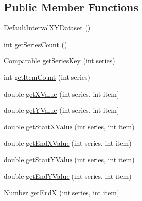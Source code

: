 \subsection*{Public Member Functions}
\begin{DoxyCompactItemize}
\item 
\mbox{\hyperlink{classorg_1_1jfree_1_1data_1_1xy_1_1_default_interval_x_y_dataset_a9995dbf4970a0f92bd1b1819335b4300}{Default\+Interval\+X\+Y\+Dataset}} ()
\item 
int \mbox{\hyperlink{classorg_1_1jfree_1_1data_1_1xy_1_1_default_interval_x_y_dataset_a11470bfa9b540c971123d4282c0f5a8a}{get\+Series\+Count}} ()
\item 
Comparable \mbox{\hyperlink{classorg_1_1jfree_1_1data_1_1xy_1_1_default_interval_x_y_dataset_a723e63b81200f1f06ffee4defe23dee9}{get\+Series\+Key}} (int series)
\item 
int \mbox{\hyperlink{classorg_1_1jfree_1_1data_1_1xy_1_1_default_interval_x_y_dataset_a902acf0c4bef6282326f87be5a8e0f10}{get\+Item\+Count}} (int series)
\item 
double \mbox{\hyperlink{classorg_1_1jfree_1_1data_1_1xy_1_1_default_interval_x_y_dataset_aecdfbb6de5b66cf970a8849b4a88efe9}{get\+X\+Value}} (int series, int item)
\item 
double \mbox{\hyperlink{classorg_1_1jfree_1_1data_1_1xy_1_1_default_interval_x_y_dataset_a924e1f58152217e3648fbe6cdc64bf34}{get\+Y\+Value}} (int series, int item)
\item 
double \mbox{\hyperlink{classorg_1_1jfree_1_1data_1_1xy_1_1_default_interval_x_y_dataset_abe34d984a43f87ac2880c8878c71587d}{get\+Start\+X\+Value}} (int series, int item)
\item 
double \mbox{\hyperlink{classorg_1_1jfree_1_1data_1_1xy_1_1_default_interval_x_y_dataset_aa54ecfa001d13ac8b1bab7e0a66d13a8}{get\+End\+X\+Value}} (int series, int item)
\item 
double \mbox{\hyperlink{classorg_1_1jfree_1_1data_1_1xy_1_1_default_interval_x_y_dataset_ac785b0168a489e325d773943bdbfb0e7}{get\+Start\+Y\+Value}} (int series, int item)
\item 
double \mbox{\hyperlink{classorg_1_1jfree_1_1data_1_1xy_1_1_default_interval_x_y_dataset_a4c259724fd0f58a34c3b0f2ea3825bc5}{get\+End\+Y\+Value}} (int series, int item)
\item 
Number \mbox{\hyperlink{classorg_1_1jfree_1_1data_1_1xy_1_1_default_interval_x_y_dataset_aadfc488215db1fe288e23180b78d5d67}{get\+EndX}} (int series, int item)
\item 

\end{DoxyCompactItemize}
